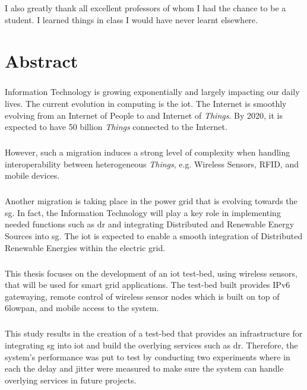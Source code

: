 \documentclass[oneside,12pt,a4paper,final]{book}
\begin{document}
\paragraph{}
I also greatly thank all excellent professors of whom I had the chance to be a student. I learned things in class  I would have never learnt elsewhere.


\chapter{Abstract}
\paragraph{}
Information Technology is growing exponentially and largely impacting our daily lives. The current evolution in computing is the \gls{iot}. The Internet is smoothly evolving from an Internet of People to and Internet of \textit{Things}. By 2020, it is expected to have 50 billion \textit{Things} connected to the Internet. 
\paragraph{}
However, such a migration induces a strong level of complexity when handling interoperability between heterogeneous \textit{Things}, e.g. Wireless Sensors, RFID, and mobile devices.
\paragraph{}
Another migration is taking place in the power grid that is evolving towards the \gls{sg}. In fact, the Information Technology will play a key role in implementing needed functions such as \gls{dr} and integrating Distributed and Renewable Energy Sources into \gls{sg}. The \gls{iot} is expected to enable a smooth integration of Distributed Renewable Energies within the electric grid.
\paragraph{}
This thesis focuses on the development of an \gls{iot} test-bed, using wireless sensors, that will be used for smart grid applications. The test-bed built provides IPv6 gatewaying, remote control of wireless sensor nodes which is built on top of \gls{6lowpan}, and mobile access to the system.
\paragraph{}
This study results in the creation of a test-bed that provides an infrastructure for integrating \gls{sg} into \gls{iot} and build the overlying services such as \gls{dr}. Therefore, the system's performance was put to test by conducting two experiments where in each the delay and jitter were measured to make sure the system can handle overlying services in future projects.
\end{document}
